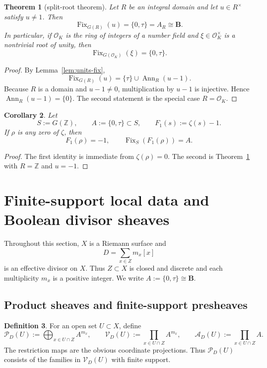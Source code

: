 \documentclass[11pt,a4paper]{article}
\newtheorem{theorem}{Theorem}[section]
\newtheorem{corollary}[theorem]{Corollary}
\theoremstyle{definition}
\newtheorem{definition}[theorem]{Definition}
\theoremstyle{remark}
\DeclareMathOperator{\Fix}{Fix}
\DeclareMathOperator{\Ann}{Ann}
\newcommand{\ZZ}{\mathbb Z}
\newcommand{\BB}{\mathbf B}
\newcommand{\taup}{\tau}
\newcommand{\Vd}{\mathcal V_D}
\newcommand{\Ad}{\mathcal A_D}
\newcommand{\Pd}{\mathcal P_D}
\begin{document}
\begin{theorem}[split-root theorem]\label{thm:split-root}
Let $R$ be an integral domain and let $u\in R^\times$ satisfy $u\neq1$. Then
\[
\Fix_{G(R)}(u)=\{0,\taup\}=A_R\cong\BB.
\]
In particular, if $\mathcal O_K$ is the ring of integers of a number field and $\xi\in\mathcal O_K^\times$ is a nontrivial root of unity, then
\[
\Fix_{G(\mathcal O_K)}(\xi)=\{0,\taup\}.
\]
\end{theorem}

\begin{proof}
By Lemma~\ref{lem:units-fix},
\[
\Fix_{G(R)}(u)=\{\taup\}\cup\Ann_R(u-1).
\]
Because $R$ is a domain and $u-1\neq0$, multiplication by $u-1$ is injective. Hence $\Ann_R(u-1)=\{0\}$.
The second statement is the special case $R=\mathcal O_K$.
\end{proof}

\begin{corollary}\label{cor:zeta-pointwise}
Let
\[
S:=G(\ZZ),\qquad A:=\{0,\taup\}\subset S,
\qquad F_1(s):=\zeta(s)-1.
\]
If $\rho$ is any zero of $\zeta$, then
\[
F_1(\rho)=-1,
\qquad
\Fix_S(F_1(\rho))=A.
\]
\end{corollary}

\begin{proof}
The first identity is immediate from $\zeta(\rho)=0$. The second is Theorem~\ref{thm:split-root} with $R=\ZZ$ and $u=-1$.
\end{proof}

\section{Finite-support local data and Boolean divisor sheaves}

Throughout this section, $X$ is a Riemann surface and
\[
D=\sum_{x\in Z}m_x[x]
\]
is an effective divisor on $X$. Thus $Z\subset X$ is closed and discrete and each multiplicity $m_x$ is a positive integer. We write $A:=\{0,\taup\}\cong\BB$.

\subsection{Product sheaves and finite-support presheaves}

\begin{definition}
For an open set $U\subset X$, define
\[
\Pd(U):=\bigoplus_{x\in U\cap Z}A^{m_x},
\qquad
\Vd(U):=\prod_{x\in U\cap Z}A^{m_x},
\qquad
\Ad(U):=\prod_{x\in U\cap Z}A.
\]
The restriction maps are the obvious coordinate projections. Thus $\Pd(U)$ consists of the families in $\Vd(U)$ with finite support.
\end{definition}
\end{document}
